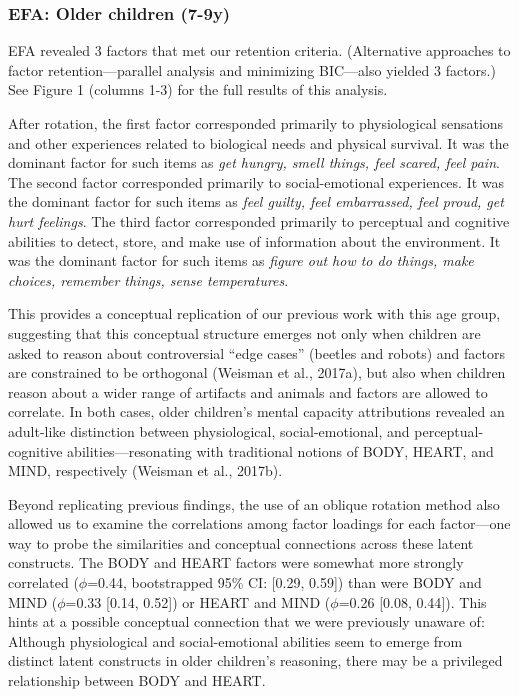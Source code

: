 \documentclass[10pt, letterpaper]{article}
\begin{document}
\subsubsection{EFA: Older children
(7-9y)}\label{efa-older-children-7-9y}

EFA revealed 3 factors that met our retention criteria. (Alternative
approaches to factor retention---parallel analysis and minimizing
BIC---also yielded 3 factors.) See Figure 1 (columns 1-3) for the full
results of this analysis.

After rotation, the first factor corresponded primarily to physiological
sensations and other experiences related to biological needs and
physical survival. It was the dominant factor for such items as
\emph{get hungry, smell things, feel scared, feel pain}. The second
factor corresponded primarily to social-emotional experiences. It was
the dominant factor for such items as \emph{feel guilty, feel
embarrassed, feel proud, get hurt feelings}. The third factor
corresponded primarily to perceptual and cognitive abilities to detect,
store, and make use of information about the environment. It was the
dominant factor for such items as \emph{figure out how to do things,
make choices, remember things, sense temperatures}.

This provides a conceptual replication of our previous work with this
age group, suggesting that this conceptual structure emerges not only
when children are asked to reason about controversial ``edge cases''
(beetles and robots) and factors are constrained to be orthogonal
(Weisman et al., 2017a), but also when children reason about a wider
range of artifacts and animals and factors are allowed to correlate. In
both cases, older children's mental capacity attributions revealed an
adult-like distinction between physiological, social-emotional, and
perceptual-cognitive abilities---resonating with traditional notions of
BODY, HEART, and MIND, respectively (Weisman et al., 2017b).

Beyond replicating previous findings, the use of an oblique rotation
method also allowed us to examine the correlations among factor loadings
for each factor---one way to probe the similarities and conceptual
connections across these latent constructs. The BODY and HEART factors
were somewhat more strongly correlated (\(\phi\)=0.44, bootstrapped 95\%
CI: {[}0.29, 0.59{]}) than were BODY and MIND (\(\phi\)=0.33 {[}0.14,
0.52{]}) or HEART and MIND (\(\phi\)=0.26 {[}0.08, 0.44{]}). This hints
at a possible conceptual connection that we were previously unaware of:
Although physiological and social-emotional abilities seem to emerge
from distinct latent constructs in older children's reasoning, there may
be a privileged relationship between BODY and HEART.
\end{document}
